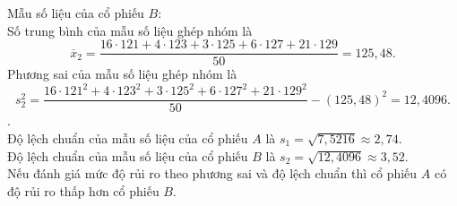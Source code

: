\begin{ex}
{\begin{itemchoice}
			Mẫu số liệu của cổ phiếu $B$:\\
			Số trung bình của mẫu số liệu ghép nhóm là
			$$\overline x_2=\dfrac{16\cdot 121+4\cdot 123+3\cdot 125+6\cdot 127 +21\cdot 129}{50}=125{,}48.$$
			Phương sai của mẫu số liệu ghép nhóm là
			$$s^2_2=\dfrac{16\cdot 121^2+4\cdot 123^2+3\cdot 125^2+6\cdot 127^2 +21\cdot 129^2}{50}-(125{,}48)^2=12{,}4096.$$
			.\\
			Độ lệch chuẩn của mẫu số liệu của cổ phiếu $A$ là $s_1=\sqrt{7{,}5216}\approx 2{,}74$.\\
			Độ lệch chuẩn của mẫu số liệu của cổ phiếu $B$ là $s_2=\sqrt{12{,}4096}\approx 3{,}52$.\\
			Nếu đánh giá mức độ rủi ro theo phương sai và độ lệch chuẩn thì cổ phiếu $A$ có độ rủi ro thấp hơn cổ phiếu $B$.
		\end{itemchoice}
	}
\end{ex}

